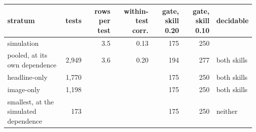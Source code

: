 \begin{tabular}{lrrrrrl}
\toprule
stratum & tests & rows per test & within-test corr. & gate, skill 0.20 & gate, skill 0.10 & decidable \\
\midrule
simulation &  & 3.5 & 0.13 & 175 & 250 &  \\
pooled, at its own dependence & 2,949 & 3.6 & 0.20 & 194 & 277 & both skills \\
headline-only & 1,770 &  &  & 175 & 250 & both skills \\
image-only & 1,198 &  &  & 175 & 250 & both skills \\
smallest, at the simulated dependence & 173 &  &  & 175 & 250 & neither \\

\end{tabular}

